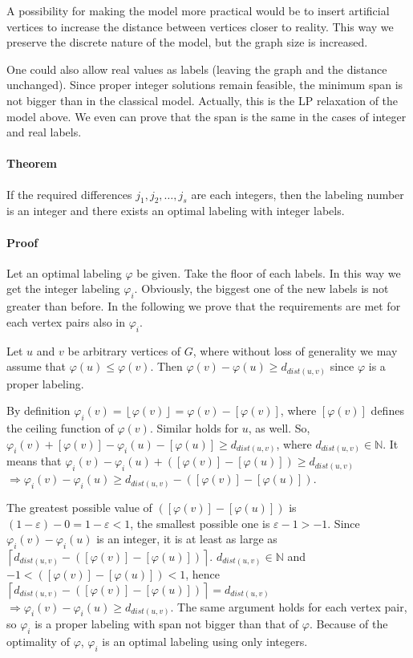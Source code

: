 \documentclass[smallextended]{svjour3}
\begin{document}
A possibility for making the model more practical would be to 
insert artificial vertices to increase the distance between vertices 
closer to reality. This way we preserve the discrete nature of the model, 
but the graph size is increased. 

One could also allow real values as labels (leaving the graph and the distance 
unchanged). Since proper integer solutions remain feasible, 
the minimum span is not bigger than in the classical model. 
Actually, this is the LP relaxation of the model above. 
 We even can prove that the span is the same in the cases of integer and real labels. 


\paragraph{Theorem} 
If the required differences $j_1,j_2,\ldots ,j_{s}$ are each integers, then the labeling number is an integer and there exists an optimal labeling with integer labels. 

\paragraph{Proof} 
Let an optimal labeling $\varphi$ be given. Take the floor of each labels. In this way we get the integer labeling $\varphi_{i}$. Obviously, the biggest one of the new labels is not greater than before. In the following we prove that the requirements are met for each vertex pairs also in $\varphi_{i}$. 

Let $u$ and $v$ be arbitrary vertices of $G$, where without loss of generality we may assume that $\varphi(u)\leq\varphi(v)$. Then $\varphi(v)-\varphi(u)\geq d_{dist(u,v)}$ since $\varphi$ is a proper labeling. 

By definition $\varphi_{i}(v)=\left\lfloor \varphi(v)\right\rfloor =\varphi(v)-[\varphi(v)]$, where $[\varphi(v)]$ defines the ceiling function of $\varphi(v)$. Similar holds for $u$, as well. So, $\varphi_{i}(v)+[\varphi(v)]-\varphi_{i}(u)-[\varphi(u)]\geq d_{dist(u,v)}$, 
where $d_{dist(u,v)}\in\mathbb{N}$. It means that $\varphi_{i}(v)-\varphi_{i}(u)+([\varphi(v)]-[\varphi(u)])\geq d_{dist(u,v)}$ 
$\Rightarrow\varphi_{i}(v)-\varphi_{i}(u)\geq d_{dist(u,v)}-([\varphi(v)]-[\varphi(u)])$. 


The greatest possible value of $([\varphi(v)]-[\varphi(u)])$ is $(1-\varepsilon)-0=1-\varepsilon<1$, the smallest possible one is $\varepsilon-1>-1$. Since $\varphi_{i}(v)-\varphi_{i}(u)$ is an integer, it is at least as large as $\left\lceil  d_{dist(u,v)}-([\varphi(v)]-[\varphi(u)])\right\rceil$. $d_{dist(u,v)}\in\mathbb{N}$ and $-1<([\varphi(v)]-[\varphi(u)])<1$, hence $\left\lceil d_{dist(u,v)}-([\varphi(v)]-[\varphi(u)])\right\rceil =d_{dist(u,v)}$ 
$\Rightarrow\varphi_{i}(v)-\varphi_{i}(u)\geq d_{dist(u,v)}$. The same argument holds for each vertex pair, so $\varphi_{i}$ is a proper labeling with span not bigger than that of $\varphi$. Because of the optimality of $\varphi$, $\varphi_{i}$ is an optimal labeling using only integers. 
\end{document}
